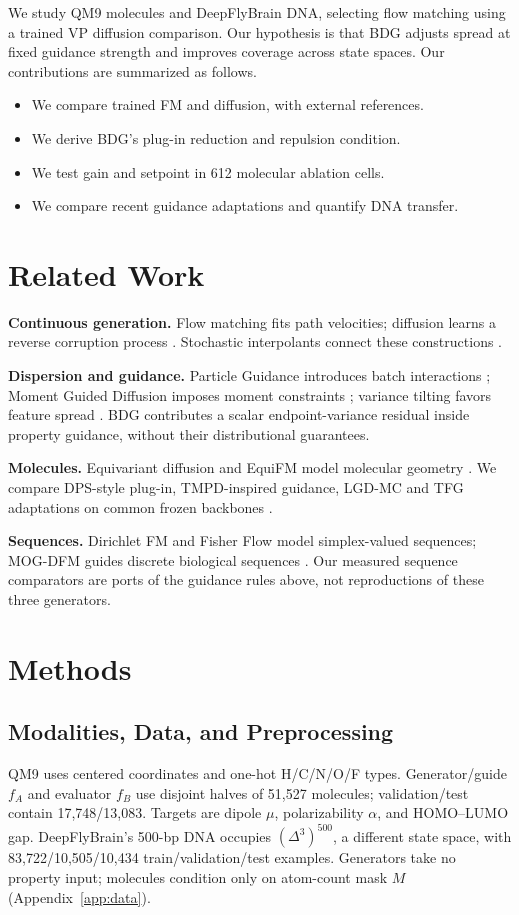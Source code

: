 \documentclass{article}
\begin{document}
We study QM9 molecules and DeepFlyBrain DNA, selecting flow matching using a trained VP diffusion comparison. Our hypothesis is that BDG adjusts spread at fixed guidance strength and improves coverage across state spaces. Our contributions are summarized as follows.
\begin{itemize}
\item We compare trained FM and diffusion, with external references.
\item We derive BDG's plug-in reduction and repulsion condition.
\item We test gain and setpoint in 612 molecular ablation cells.
\item We compare recent guidance adaptations and quantify DNA transfer.
\end{itemize}

\section{Related Work}
\textbf{Continuous generation.} Flow matching fits path velocities; diffusion learns a reverse corruption process \citep{lipman2022flow,karras2022elucidating}. Stochastic interpolants connect these constructions \citep{albergo2025stochastic}.

\textbf{Dispersion and guidance.} Particle Guidance introduces batch interactions \citep{corso2024particle}; Moment Guided Diffusion imposes moment constraints \citep{mgd2026moment}; variance tilting favors feature spread \citep{vtd2026variance}. BDG contributes a scalar endpoint-variance residual inside property guidance, without their distributional guarantees.

\textbf{Molecules.} Equivariant diffusion and EquiFM model molecular geometry \citep{hoogeboom2022equivariant,song2023equifm}. We compare DPS-style plug-in, TMPD-inspired guidance, LGD-MC and TFG adaptations on common frozen backbones \citep{chung2023dps,boys2024tmpd,song2023lgd,ye2024tfg}.

\textbf{Sequences.} Dirichlet FM and Fisher Flow model simplex-valued sequences; MOG-DFM guides discrete biological sequences \citep{stark2024dirichlet,davis2024fisher,chen2025multi}. Our measured sequence comparators are ports of the guidance rules above, not reproductions of these three generators.

\section{Methods}
\subsection{Modalities, Data, and Preprocessing}\label{sec:data}
QM9 \citep{ramakrishnan2014qm9} uses centered coordinates and one-hot H/C/N/O/F types. Generator/guide $f_A$ and evaluator $f_B$ use disjoint halves of 51,527 molecules; validation/test contain 17,748/13,083. Targets are dipole $\mu$, polarizability $\alpha$, and HOMO--LUMO gap. DeepFlyBrain's 500-bp DNA occupies $(\Delta^3)^{500}$, a different state space, with 83,722/10,505/10,434 train/validation/test examples. Generators take no property input; molecules condition only on atom-count mask $M$ (Appendix~\ref{app:data}).
\end{document}
